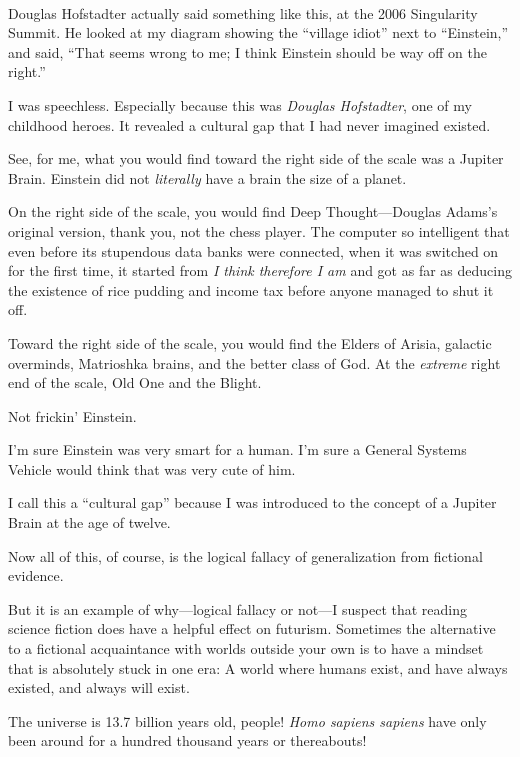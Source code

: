 \bigskip

{
 ~}

{
 Douglas Hofstadter actually said something like this, at the 2006
Singularity Summit. He looked at my diagram showing the
``village idiot'' next to
``Einstein,'' and said,
``That seems wrong to me; I think Einstein should be
way off on the right.''}

{
 I was speechless. Especially because this was \textit{Douglas
Hofstadter}, one of my childhood heroes. It revealed a cultural gap
that I had never imagined existed.}

{
 See, for me, what you would find toward the right side of the
scale was a Jupiter Brain. Einstein did not \textit{literally} have a
brain the size of a planet.}

{
 On the right side of the scale, you would find Deep
Thought---Douglas Adams's original version, thank you,
not the chess player. The computer so intelligent that even before its
stupendous data banks were connected, when it was switched on for the
first time, it started from \textit{I think therefore I am} and got as
far as deducing the existence of rice pudding and income tax before
anyone managed to shut it off.}

{
 Toward the right side of the scale, you would find the Elders of
Arisia, galactic overminds, Matrioshka brains, and the better class of
God. At the \textit{extreme} right end of the scale, Old One and the
Blight.}

{
 Not frickin' Einstein.}

{
 I'm sure Einstein was very smart for a human.
I'm sure a General Systems Vehicle would think that was
very cute of him.}

{
 I call this a ``cultural gap''
because I was introduced to the concept of a Jupiter Brain at the age
of twelve.}

{
 Now all of this, of course, is the logical fallacy of
generalization from fictional evidence.}

{
 But it is an example of why---logical fallacy or not---I suspect
that reading science fiction does have a helpful effect on futurism.
Sometimes the alternative to a fictional acquaintance with worlds
outside your own is to have a mindset that is absolutely stuck in one
era: A world where humans exist, and have always existed, and always
will exist.}

{
 The universe is 13.7 billion years old, people! \textit{Homo
sapiens sapiens} have only been around for a hundred thousand years or
thereabouts!}

